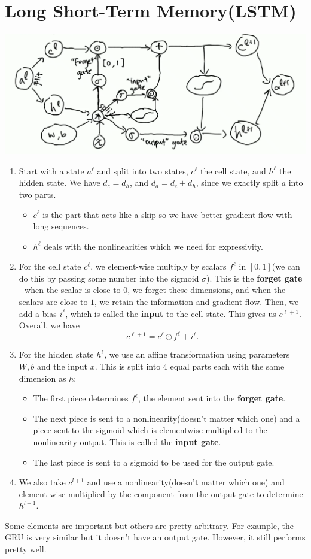 \documentclass[11pt]{scrartcl}
\begin{document}
\section{Long Short-Term Memory(LSTM)}
\begin{center}
\includegraphics[scale=0.5]{images/lstm.png}
\end{center}

\begin{enumerate}
\item Start with a state $a^{\ell}$ and split into two states, $c^\ell$ the cell state, and $h^{\ell}$ the hidden state.  We have $d_{c} = d_h$, and $d_a = d_c + d_h$, since we exactly split $a$ into two parts. 
\begin{itemize}
\item $c^\ell$ is the part that acts like a skip so we have better gradient flow with long sequences.  
\item $h^\ell$ deals with the nonlinearities which we need for expressivity. 
\end{itemize}
\item For the cell state $c^\ell$, we element-wise multiply by scalars $f^\ell$ in $[0, 1]$(we can do this by passing some number into the sigmoid $\sigma$).  This is the \textbf{forget gate} - when the scalar is close to $0$, we forget these dimensions, and when the scalars are close to $1$, we retain the information and gradient flow.  Then, we add a bias $i^\ell$, which is called the \textbf{input} to the cell state.  This gives us $c^{\ell + 1}$.  Overall, we have 
$$c^{\ell + 1} = c^{\ell} \odot f^{\ell} + i^\ell.$$
\item For the hidden state $h^\ell$, we use an affine transformation using parameters $W, b$ and the input $x$.  This is split into $4$ equal parts each with the same dimension as $h$:
\begin{itemize}
\item The first piece determines $f^\ell$, the element sent into the \textbf{forget gate}.
\item The next piece is sent to a nonlinearity(doesn't matter which one) and a piece sent to the sigmoid which is elementwise-multiplied to the nonlinearity output.  This is called the \textbf{input gate}.
\item The last piece is sent to a sigmoid to be used for the output gate.
\end{itemize}
\item We also take $c^{l+1}$ and use a nonlinearity(doesn't matter which one) and element-wise multiplied by the component from the output gate to determine $h^{l+1}$.
\end{enumerate}

\begin{remark} Some elements are important but others are pretty arbitrary.  For example, the GRU is very similar but it doesn't have an output gate.  However, it still performs pretty well.
\end{remark}
\end{document}
